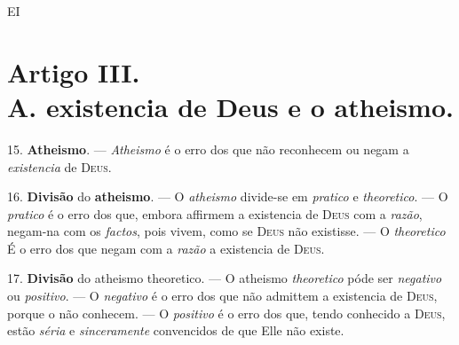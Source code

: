  EI


\section*{Artigo III.\\ A. existencia de Deus e o atheismo.}

15. \textbf{Atheismo}. --- \emph{Atheismo} é o erro dos que não reconhecem ou negam a \emph{existencia} de \textsc{Deus}.

16. \textbf{Divisão} do \textbf{atheismo}. --- O \emph{atheismo} divide-se em \emph{pratico} e \emph{theoretico}. --- O \emph{pratico} é o erro dos que, embora affirmem a existencia de \textsc{Deus} com a \emph{razão}, negam-na com os \emph{factos}, pois vivem, como se \textsc{Deus} não existisse. --- O \emph{theoretico} É o erro dos que negam com a \emph{razão} a existencia de \textsc{Deus}.

17. \textbf{Divisão} do atheismo theoretico. --- O atheismo \emph{theoretico} póde ser \emph{negativo} ou \emph{positivo}. --- O \emph{negativo} é o erro dos que não admittem a existencia de \textsc{Deus}, porque o não conhecem. --- O \emph{positivo} é o erro dos que, tendo conhecido a \textsc{Deus}, estão \emph{séria} e \emph{sinceramente} convencidos de que Elle não existe.

